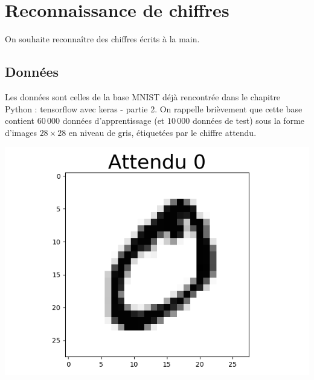 \documentclass[11pt,class=report,crop=false]{standalone}
\begin{document}









\section{Reconnaissance de chiffres}

On souhaite reconnaître des chiffres écrits à la main.

\subsection{Données}


Les données sont celles de la base  MNIST déjà rencontrée dans le chapitre \og{}Python : tensorflow avec keras - partie 2\fg{}.
On rappelle brièvement que cette base contient $60\,000$ données d'apprentissage (et $10\,000$ données de test) sous la forme d'images $28\times28$ en niveau de gris, étiquetées par le chiffre attendu.
\begin{center}
\includegraphics[scale=\myscale,scale=0.5]{figures/tfconv-chiffre-train-1}
\end{center}
\end{document}
